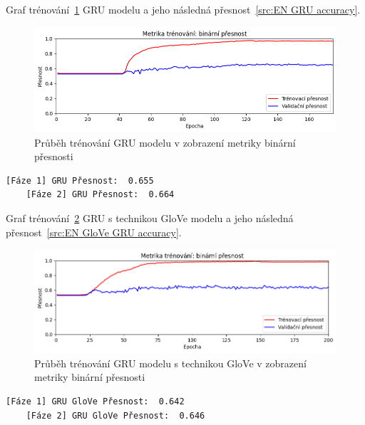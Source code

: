 Graf trénování~\ref{fig:EN GRU model train} GRU modelu a jeho následná přesnost~\ref{src:EN GRU accuracy}.
\begin{figure}[H]
	\centering
	\includegraphics[width=1\textwidth]{Figures/EN_GRU_binarni_presnost.png}
	\caption{Průběh trénování GRU modelu v zobrazení metriky binární přesnosti}\label{fig:EN GRU model train}
\end{figure}
\begin{lstlisting}[label=src:EN GRU accuracy, caption={Výsledek GRU modelu na anglickém datasetu po trénování~\ref{fig:EN GRU model train}}]
	[Fáze 1] GRU Přesnost:  0.655
	[Fáze 2] GRU Přesnost:  0.664
\end{lstlisting}

Graf trénování~\ref{fig:EN GloVe GRU model train} GRU s technikou GloVe modelu a jeho následná přesnost~\ref{src:EN GloVe GRU accuracy}.
\begin{figure}[H]
	\centering
	\includegraphics[width=1\textwidth]{Figures/EN_GRU_GLOVE_binarni_presnost.png}
	\caption{Průběh trénování GRU modelu s technikou GloVe v zobrazení metriky binární přesnosti}\label{fig:EN GloVe GRU model train}
\end{figure}
\begin{lstlisting}[label=src:EN GloVe GRU accuracy, caption={Výsledek GRU modelu s technikou GloVe na anglickém datasetu po trénování~\ref{fig:EN GloVe GRU model train}}]
	[Fáze 1] GRU GloVe Přesnost:  0.642
	[Fáze 2] GRU GloVe Přesnost:  0.646
\end{lstlisting}

